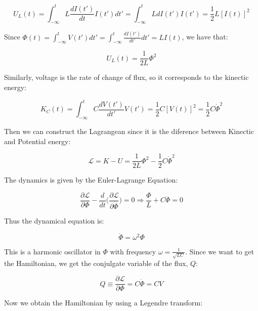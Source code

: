 \begin{equation}
    U_L (t) = \int_{-\infty}^t L \frac{dI(t')}{dt} I(t') dt' = \int_{-\infty}^t L dI(t') I(t') = \frac{1}{2} L [I(t)]^2
\end{equation}

Since $\Phi (t) = \int_{-\infty}^t V(t') dt' = \int_{-\infty}^t \frac{dI(t')}{dt'} dt' = L I(t)$, we have that:

\begin{equation}
    U_L (t) = \frac{1}{2L} \Phi^2
\end{equation}

Similarly, voltage is the rate of change of flux, so it corresponds to the kinectic energy:

\begin{equation}
    K_C (t) = \int_{-\infty}^t C \frac{dV(t')}{dt'} V(t') = \frac{1}{2} C [V(t)]^2 = \frac{1}{2} C \dot{\Phi}^2
\end{equation}

Then we can construct the Lagrangean since it is the diference between Kinectic and Potential energy:

\begin{equation}
    \mathcal{L} = K - U = \frac{1}{2L} \Phi^2 - \frac{1}{2} C \dot{\Phi}^2
\end{equation}

The dynamics is given by the Euler-Lagrange Equation:

\begin{equation}
    \frac{\partial \mathcal{L}}{\partial \Phi} - \frac{d}{dt}\bigg(\frac{\partial \mathcal{L}}{\partial \dot{\Phi}} \bigg) = 0 \Rightarrow \frac{\Phi}{L} + C \ddot{\Phi} = 0
\end{equation}

Thus the dynamical equation is:

\begin{equation}
    \ddot{\Phi} = \omega^2 \Phi
\end{equation}

This is a harmonic oscillator in $\Phi$ with frequency $\omega = \frac{1}{\sqrt{LC}}$. Since we want to get the Hamiltonian, we get the conjulgate variable of the flux, $Q$:

\begin{equation}
    Q \equiv \frac{\partial \mathcal{L}}{\partial \Phi} = C \dot{\Phi} = C V
\end{equation}

Now we obtain the Hamiltonian by using a Legendre transform:

